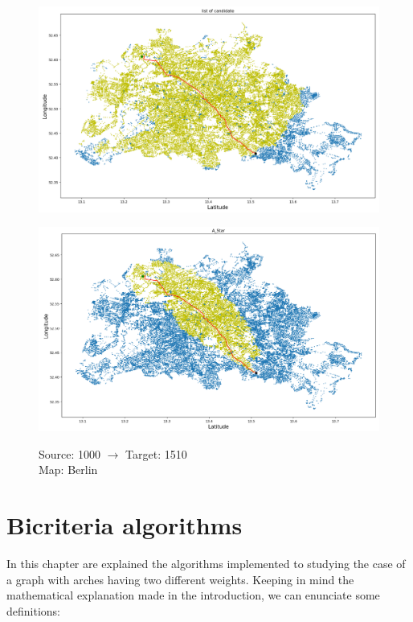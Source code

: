 \documentclass[a4paper,11pt]{report}
\begin{document}
\begin{figure}[H]
	\centering
	\begin{minipage}[b]{\textwidth}
		\includegraphics[width=\textwidth]{img/mapOutput/1000->1510BerlinLoC.png}
		\label{fig:ListOfCandidate3}
	\end{minipage}
	\hfill
	\begin{minipage}[b]{\textwidth}
		\includegraphics[width=\textwidth]{img/mapOutput/1000->1510BerlinA_Star.png}
		\label{fig:A_Start3}
	\end{minipage}
	Source: 1000 $\to$ Target: 1510\\Map: Berlin
\end{figure}

\chapter{Bicriteria algorithms}

In this chapter are explained the algorithms implemented to studying the case of a graph with arches having two different weights.
Keeping in mind the mathematical explanation made in the introduction, we can enunciate some definitions:
\end{document}
